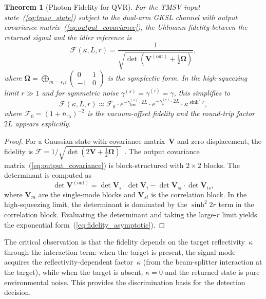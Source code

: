 \documentclass[journal]{IEEEtran}
\newtheorem{theorem}{Theorem}
\begin{document}
\begin{theorem}[Photon Fidelity for QVR]\label{thm:fidelity}
For the TMSV input state~(\ref{eq:tmsv_state}) subject to the dual-arm GKSL channel with output covariance matrix~(\ref{eq:output_covariance}), the Uhlmann fidelity between the returned signal and the idler reference is
\begin{equation}\label{eq:fidelity_closed}
\mathcal{F}(\kappa, L, r) = \frac{1}{\sqrt{\det(\mathbf{V}^{(\text{out})} + \tfrac{1}{2}\boldsymbol{\Omega})}},
\end{equation}
where $\boldsymbol{\Omega} = \bigoplus_{m=s,i}\begin{pmatrix}0 & 1 \\ -1 & 0\end{pmatrix}$ is the symplectic form. In the high-squeezing limit $r \gg 1$ and for symmetric noise $\gamma^{(s)} = \gamma^{(i)} = \gamma$, this simplifies to
\begin{equation}\label{eq:fidelity_asymptotic}
\mathcal{F}(\kappa, L, r) \approx \mathcal{F}_0 \cdot e^{-\gamma_{\text{loss}}^{(s)} \cdot 2L} \cdot e^{-\gamma_{\varphi}^{(s)} \cdot 2L} \cdot \kappa^{\sinh^2 r},
\end{equation}
where $\mathcal{F}_0 = (1 + \bar{n}_{\text{th}})^{-2}$ is the vacuum-offset fidelity and the round-trip factor~$2L$ appears explicitly.
\end{theorem}

\begin{proof}
For a Gaussian state with covariance matrix~$\mathbf{V}$ and zero displacement, the fidelity is $\mathcal{F} = 1/\sqrt{\det(2\mathbf{V} + \tfrac{1}{2}\boldsymbol{\Omega})}$~\cite{weedbrook2012gaussian}. The output covariance matrix~(\ref{eq:output_covariance}) is block-structured with $2\times 2$ blocks. The determinant is computed as
\begin{equation}
\det\mathbf{V}^{(\text{out})} = \det\mathbf{V}_s \cdot \det\mathbf{V}_i - \det\mathbf{V}_{si} \cdot \det\mathbf{V}_{is},
\end{equation}
where $\mathbf{V}_m$ are the single-mode blocks and $\mathbf{V}_{si}$ is the correlation block. In the high-squeezing limit, the determinant is dominated by the $\sinh^2 2r$ term in the correlation block. Evaluating the determinant and taking the large-$r$ limit yields the exponential form~(\ref{eq:fidelity_asymptotic}).
\end{proof}

The critical observation is that the fidelity depends on the target reflectivity~$\kappa$ through the interaction term: when the target is present, the signal mode acquires the reflectivity-dependent factor~$\kappa$ (from the beam-splitter interaction at the target), while when the target is absent, $\kappa = 0$ and the returned state is pure environmental noise. This provides the discrimination basis for the detection decision.
\end{document}
